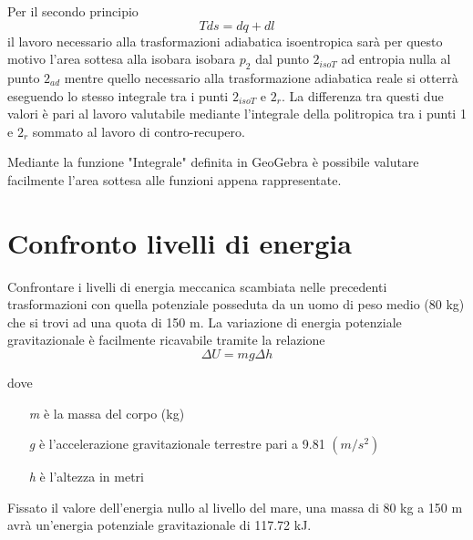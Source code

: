 \documentclass[a4paper,12pt]{article}
\begin{document}
Per il secondo principio
\begin{equation}
    \label{eq:seconmdo_principio}
    Tds = dq + dl
\end{equation}
il lavoro necessario alla trasformazioni adiabatica isoentropica sarà per questo motivo l'area sottesa
alla isobara isobara $p_2$ dal punto $2_{isoT}$ ad entropia nulla al punto $2_{ad}$
mentre quello necessario alla trasformazione adiabatica reale si otterrà eseguendo lo stesso integrale tra i punti
$2_{isoT}$ e $2_r$.
La differenza tra questi due valori è pari al lavoro valutabile mediante l'integrale della politropica tra i punti
1 e $2_r$ sommato al lavoro di contro-recupero.

Mediante la funzione "Integrale" definita in GeoGebra è possibile valutare facilmente
l'area sottesa alle funzioni appena rappresentate.

\section{Confronto livelli di energia}
Confrontare i livelli di energia meccanica scambiata nelle precedenti trasformazioni con 
quella potenziale posseduta da un uomo di peso medio (80 kg) che si trovi ad una quota di 150 m.
La variazione di energia potenziale gravitazionale è facilmente ricavabile tramite la relazione
\begin{equation}
    \Delta U = mg\Delta h
\end{equation}

dove
\begin{itemize}
    \item[\textit{m}] è la massa del corpo (kg)
    \item[\textit{g}] è l'accelerazione gravitazionale terrestre pari a 9.81 $(m/s^2)$ 
    \item[\textit{h}] è l'altezza in metri
\end{itemize}  
Fissato il valore dell'energia nullo al livello del mare, una massa di 80 kg a 150 m avrà
un'energia potenziale gravitazionale di 117.72 kJ.
\end{document}
